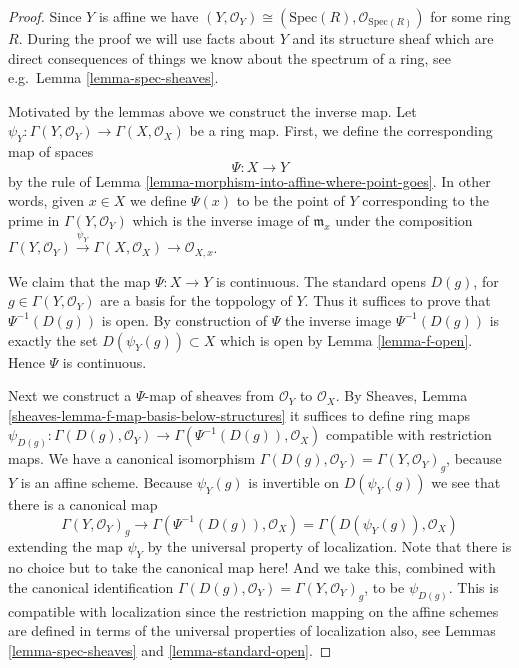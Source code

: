\begin{proof}
Since $Y$ is affine we have
$(Y, \mathcal{O}_Y) \cong (\text{Spec}(R), \mathcal{O}_{\text{Spec}(R)})$
for some ring $R$.
During the proof we will use facts about $Y$ and
its structure sheaf which are direct consequences of things
we know about the spectrum of a ring, see e.g.\ Lemma
\ref{lemma-spec-sheaves}.

\medskip\noindent
Motivated by the lemmas above we construct the inverse map.
Let $\psi_Y : \Gamma(Y, \mathcal{O}_Y) \to \Gamma(X, \mathcal{O}_X)$
be a ring map. First, we define the corresponding map of
spaces
$$
\Psi : X \longrightarrow Y
$$
by the rule of
Lemma \ref{lemma-morphism-into-affine-where-point-goes}.
In other words, given $x \in X$ we define $\Psi(x)$
to be the point of $Y$ corresponding to the prime
in $\Gamma(Y, \mathcal{O}_Y)$ which is the inverse
image of $\mathfrak m_x$ under the composition
$
\Gamma(Y, \mathcal{O}_Y) \xrightarrow{\psi_Y}
\Gamma(X, \mathcal{O}_X) \to
\mathcal{O}_{X, x}
$.

\medskip\noindent
We claim that the map $\Psi : X \to Y$ is continuous.
The standard opens $D(g)$, for $g \in \Gamma(Y, \mathcal{O}_Y)$
are a basis for the toppology of $Y$. Thus it suffices to prove
that $\Psi^{-1}(D(g))$ is open. By construction of $\Psi$
the inverse image $\Psi^{-1}(D(g))$ is exactly the set
$D(\psi_Y(g)) \subset X$ which is open by Lemma \ref{lemma-f-open}.
Hence $\Psi$ is continuous.

\medskip\noindent
Next we construct a $\Psi$-map of sheaves from
$\mathcal{O}_Y$ to $\mathcal{O}_X$. By
Sheaves, Lemma \ref{sheaves-lemma-f-map-basis-below-structures}
it suffices to define ring maps
$\psi_{D(g)} : \Gamma(D(g), \mathcal{O}_Y) \to
\Gamma(\Psi^{-1}(D(g)), \mathcal{O}_X)$
compatible with restriction maps.
We have a canonical isomorphism
$\Gamma(D(g), \mathcal{O}_Y) = \Gamma(Y, \mathcal{O}_Y)_g$,
because $Y$ is an affine scheme.
Because $\psi_Y(g)$ is invertible on $D(\psi_Y(g))$
we see that there is a canonical map
$$
\Gamma(Y, \mathcal{O}_Y)_g
\longrightarrow
\Gamma(\Psi^{-1}(D(g)), \mathcal{O}_X)
=
\Gamma(D(\psi_Y(g)), \mathcal{O}_X) 
$$
extending the map $\psi_Y$
by the universal property of localization.
Note that there is no choice but to take the canonical map here!
And we take this, combined
with the canonical identification
$\Gamma(D(g), \mathcal{O}_Y) = \Gamma(Y, \mathcal{O}_Y)_g$, to
be $\psi_{D(g)}$. This is compatible with localization since the
restriction mapping on the affine schemes are defined in terms
of the universal properties of localization also, see
Lemmas \ref{lemma-spec-sheaves} and \ref{lemma-standard-open}.


\end{proof}

